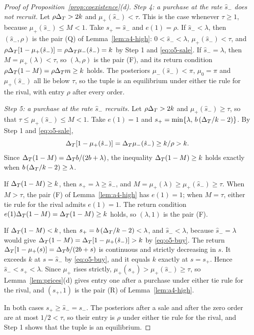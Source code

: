 \begin{proof}[Proof of Proposition~\ref{prop:coexistence}(d)]
\emph{Step 4: a purchase at the rate \(\hat s_-\) does not recruit.} Let \(\rho\Delta_T>2k\) and \(\mu_+(\hat s_-)<\tau\). This
is the case whenever \(\tau\ge1\), because \(\mu_+(\hat s_-)\le M<1\). Take \(s_+=\hat s_-\) and \(e(1)=\rho\). If
\(\hat s_-<\lambda\), then \((\hat s_-,\rho)\) is the pair (Q) of Lemma~\ref{lem:a4-high}: \(0<\hat s_-<\lambda\),
\(\mu_+(\hat s_-)<\tau\), and \(\rho\Delta_T[1-\mu_+(\hat s_-)]=\rho\Delta_T\mu_-(\hat s_-)=k\) by Step 1 and \eqref{eq:o5-sale}. If
\(\hat s_-=\lambda\), then \(M=\mu_+(\lambda)<\tau\), so \((\lambda,\rho)\) is the pair (F), and its return condition
\(\rho\Delta_T(1-M)=\rho\Delta_T m\ge k\) holds. The posteriors \(\mu_-(\hat s_-)<\pi\), \(\mu_0=\pi\) and \(\mu_+(\hat s_-)\) all lie
below \(\tau\), so the tuple is an equilibrium under either tie rule for the rival, with entry \(\rho\) after every order.

\emph{Step 5: a purchase at the rate \(\hat s_-\) recruits.} Let \(\rho\Delta_T>2k\) and \(\mu_+(\hat s_-)\ge\tau\), so that
\(\tau\le\mu_+(\hat s_-)\le M<1\). Take \(e(1)=1\) and \(s_+=\min\{\lambda,\,b\,(\Delta_T/k-2)\}\). By Step 1 and
\eqref{eq:o5-sale},
\begin{equation}\label{eq:o5-buy}
\Delta_T[1-\mu_+(\hat s_-)]=\Delta_T\mu_-(\hat s_-)\ge k/\rho>k .
\end{equation}
Since \(\Delta_T(1-M)=\Delta_T b/(2b+\lambda)\), the inequality \(\Delta_T(1-M)\ge k\) holds exactly when \(b\,(\Delta_T/k-2)\ge\lambda\).

If \(\Delta_T(1-M)\ge k\), then \(s_+=\lambda\ge\hat s_-\), and \(M=\mu_+(\lambda)\ge\mu_+(\hat s_-)\ge\tau\). When \(M>\tau\), the
pair (F) of Lemma~\ref{lem:a4-high} has \(e(1)=1\); when \(M=\tau\), either tie rule for the rival admits \(e(1)=1\). The
return condition \(e(1)\Delta_T(1-M)=\Delta_T(1-M)\ge k\) holds, so \((\lambda,1)\) is the pair (F).

If \(\Delta_T(1-M)<k\), then \(s_+=b\,(\Delta_T/k-2)<\lambda\), and \(\hat s_-<\lambda\), because \(\hat s_-=\lambda\) would give
\(\Delta_T(1-M)=\Delta_T[1-\mu_+(\hat s_-)]>k\) by \eqref{eq:o5-buy}. The return \(\Delta_T[1-\mu_+(s)]=\Delta_T b/(2b+s)\) is continuous
and strictly decreasing in \(s\). It exceeds \(k\) at \(s=\hat s_-\) by \eqref{eq:o5-buy}, and it equals \(k\) exactly
at \(s=s_+\). Hence \(\hat s_-<s_+<\lambda\). Since \(\mu_+\) rises strictly, \(\mu_+(s_+)>\mu_+(\hat s_-)\ge\tau\), so
Lemma~\ref{lem:prices}(d) gives entry one after a purchase under either tie rule for the rival, and \((s_+,1)\) is the pair
(R) of Lemma~\ref{lem:a4-high}.

In both cases \(s_+\ge\hat s_-=s_-\). The posteriors after a sale and after the zero order are at most \(1/2<\tau\),
so their entry is \(\rho\) under either tie rule for the rival, and Step 1 shows that the tuple is an equilibrium.
\end{proof}

